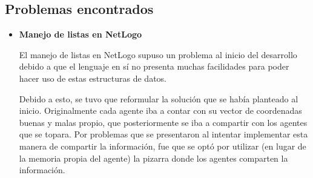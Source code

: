 \documentclass[times,10pt,twocolumn]{article}
\begin{document}
\subsection{Problemas encontrados}
\label{subsec:problemas_encontrados}
\begin{itemize}
    \item \textbf{Manejo de listas en NetLogo}\par 
    El manejo de listas en NetLogo supuso un problema al inicio del desarrollo debido a que el lenguaje en sí no presenta muchas facilidades para poder hacer uso de estas estructuras de datos.\par
    Debido a esto, se tuvo que reformular la solución que se había planteado al inicio. Originalmente cada agente iba a contar con su vector de coordenadas buenas y malas propio, que posteriormente se iba a compartir con los agentes que se topara. Por problemas que se presentaron al intentar implementar esta manera de compartir la información, fue que se optó por utilizar (en lugar de la memoria propia del agente) la pizarra donde los agentes comparten la información. 
\end{itemize}
\end{document}
